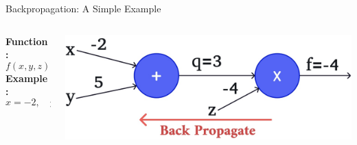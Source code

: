 \documentclass[serif, aspectratio=169]{beamer}
\begin{document}
\begin{frame}{Backpropagation: A Simple Example}

    \begin{columns}
        \begin{column}{0.3\textwidth}
            \vspace{-0.4cm} %
            \textbf{Function:} 
            \[
            f(x, y, z) = (x + y)z
            \]
            \textbf{Example:} 
            \[
            x = -2, \quad y = 5, \quad z = -4
            \]
        \end{column}

        \begin{column}{0.7\textwidth}
                    \begin{center}
                \includegraphics[width=\textwidth, keepaspectratio]{pic/b2.jpg}
            \end{center}
        \end{column}
    \end{columns}
\end{frame}
\end{document}
